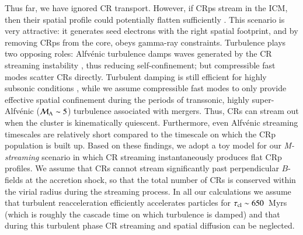 \documentclass[fleqn,usenatbib,useAMS]{mnras}
\newcommand{\Mstream}{{\it M-streaming}\xspace}
\begin{document}
Thus far, we have ignored CR transport. However, if CRps stream in the ICM, then
their spatial profile could potentially flatten sufficiently
\citep{ensslin11,wiener13}. This scenario is very attractive: it generates seed
electrons with the right spatial footprint, and by removing CRps from the core,
obeys gamma-ray constraints. Turbulence plays two opposing roles: Alfv{\'e}nic
turbulence damps waves generated by the CR streaming instability
\citep{yan02,farmer04}, thus reducing self-confinement; but compressible fast
modes scatter CRs directly. Turbulent damping is still efficient for highly
subsonic conditions \citep{wiener13}, while we assume compressible fast modes to
only provide effective spatial confinement during the periods of transsonic,
highly super-Alfv{\'e}nic ($\mathcal{M}_{\rm A} \sim 5$) turbulence associated with
mergers. Thus, CRs can stream out when the cluster is kinematically
quiescent. Furthermore, even Alfv{\'e}nic streaming timescales are relatively
short \cite[$\sim 0.1-0.5$ Gyr;][]{wiener13} compared to the timescale on which
the CRp population is built up. Based on these findings, we adopt a toy model
for our \Mstream scenario in which CR streaming instantaneously produces flat
CRp profiles. We assume that CRs cannot stream significantly past perpendicular
$B$-fields at the accretion shock, so that the total number of CRs is conserved
within the virial radius during the streaming process.  In all our calculations
we assume that turbulent reacceleration efficiently accelerates particles for
$\tau_{\mathrm{cl}}\sim650$~Myrs (which is roughly the cascade time on which
turbulence is damped) and that during this turbulent phase CR streaming and
spatial diffusion can be neglected.
\end{document}
